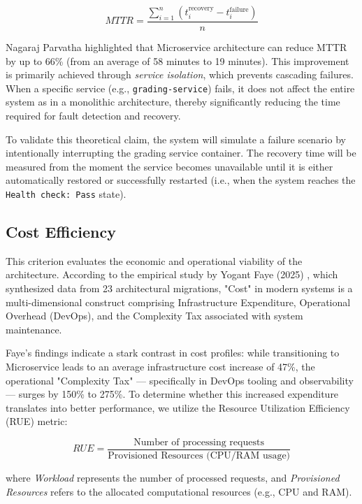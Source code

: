\begin{equation}
MTTR = \frac{\sum_{i=1}^{n} \left( t^{\text{recovery}}_i - t^{\text{failure}}_i \right)}{n}
\label{eq:mttr}
\end{equation}

Nagaraj Parvatha highlighted that Microservice architecture can reduce MTTR by up to 66\% (from an average of 58 minutes to 19 minutes). This improvement is primarily achieved through \textit{service isolation}, which prevents cascading failures. When a specific service (e.g., \texttt{grading-service}) fails, it does not affect the entire system as in a monolithic architecture, thereby significantly reducing the time required for fault detection and recovery.

To validate this theoretical claim, the system will simulate a failure scenario by intentionally interrupting the grading service container. The recovery time will be measured from the moment the service becomes unavailable until it is either automatically restored or successfully restarted (i.e., when the system reaches the \texttt{Health check: Pass} state).

\subsection{Cost Efficiency}

This criterion evaluates the economic and operational viability of the architecture. According to the empirical 
study by Yogant Faye (2025) \cite{Yogant_Faye}, which synthesized data from 23 architectural 
migrations, "Cost" in modern systems is a multi-dimensional construct comprising Infrastructure
Expenditure, Operational Overhead (DevOps), and the Complexity Tax associated with system maintenance.

Faye’s findings indicate a stark contrast in cost profiles: while transitioning to Microservice 
leads to an average infrastructure cost increase of 47\%, the operational "Complexity Tax" — specifically
in DevOps tooling and observability — surges by 150\% to 275\%. To determine whether this 
increased expenditure translates into better performance, we utilize the Resource Utilization Efficiency (RUE) metric:

\begin{equation}
RUE = \frac{\text{Number of processing requests}}{\text{Provisioned Resources (CPU/RAM usage)}}
\label{eq:rue}
\end{equation}

where \textit{Workload} represents the number of processed 
requests, and \textit{Provisioned Resources} refers to the 
allocated computational resources (e.g., CPU and RAM).

